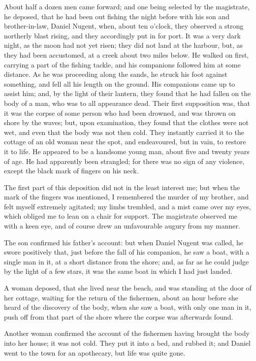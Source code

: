 About half a dozen men came forward;
and one being selected by the
magistrate, he deposed, that he had
been out fishing the night before with
his son and brother-in-law, Daniel Nugent,
when, about ten o'clock, they observed
a strong northerly blast rising,
and they accordingly put in for port.
It was a very dark night, as the moon
had not yet risen; they did not land at
the harbour, but, as they had been accustomed,
at a creek about two miles
below. He walked on first, carrying
a part of the fishing tackle, and his
companions followed him at some distance.
As he was proceeding along the
sands, he struck his foot against something,
and fell all his length on the
ground. His companions came up to
assist him; and, by the light of their
lantern, they found that he had fallen
on the body of a man, who was to all
appearance dead. Their first supposition
was, that it was the corpse of
some person who had been drowned,
and was thrown on shore by the waves;
but, upon examination, they found that
the clothes were not wet, and even that
the body was not then cold. They instantly
carried it to the cottage of an
old woman near the spot, and endeavoured,
but in vain, to restore it to life.
He appeared to be a handsome young
man, about five and twenty years of age.
He had apparently been strangled; for
there was no sign of any violence, except
the black mark of fingers on his
neck.

The first part of this deposition did
not in the least interest me; but when
the mark of the fingers was mentioned,
I remembered the murder of my brother,
and felt myself extremely agitated;
my limbs trembled, and a mist came
over my eyes, which obliged me to lean
on a chair for support. The magistrate
observed me with a keen eye,
and of course drew an unfavourable
augury from my manner.

The son confirmed his father's account:
but when Daniel Nugent was
called, he swore positively that, just
before the fall of his companion, he
saw a boat, with a single man in it, at
a short distance from the shore; and,
as far as he could judge by the light of
a few stars, it was the same boat in
which I had just landed.

A woman deposed, that she lived
near the beach, and was standing at
the door of her cottage, waiting for the
return of the fishermen, about an hour
before she heard of the discovery of the
body, when she saw a boat, with only
one man in it, push off from that
part of the shore where the corpse was
afterwards found.

Another woman confirmed the
account of the fishermen having brought
the body into her house; it was not
cold. They put it into a bed, and
rubbed it; and Daniel went to the
town for an apothecary, but life was
quite gone.

